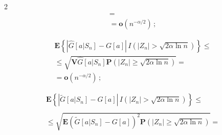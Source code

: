 \begin{multicols}{2}
\begin{multline}
 ={}\\


 {}= \mathbf{o}\left(n^{-\alpha/2}\right)\,;


 \label{e16-ch}


 \end{multline}


 


 \vspace*{-12pt}


 


 \noindent


 \begin{multline}


 \mathbf{E} \left\{\left|\widehat{G}[a|S_n]-G[a]\right|


 \, I\left(|Z_n|>\sqrt{2\alpha\ln n}\right)\right\}\le{} 


\\ 


 \le\sqrt{\mathbf{V} \widehat{G}[a|S_n]


 \mathbf{P}\left( \left| {Z_n } \right| \ge \sqrt {2\alpha \ln n}\right)}


  ={}\\


  {}= \mathbf{o}\left(n^{-\alpha/2}\right)\,;


\label{e17-ch}


\end{multline}





 


 \vspace*{-12pt}


 


 \noindent


 \begin{multline}


 \mathbf{E} \left\{\left|\widetilde{G}[a|S_n]-G[a]\right|


 \, I\left(|Z_n|>\sqrt{2\alpha\ln n}\right)\right\}\le{}\\


\\


 {}\le\sqrt{\mathbf{E} \left(\widetilde{G}[a|S_n]-G[a]\right)^2


 \mathbf{P}\left( \left| {Z_n } \right| \ge \sqrt {2\alpha \ln n}\right)}


  = {}\\



\end{multline}
\end{multicols}
